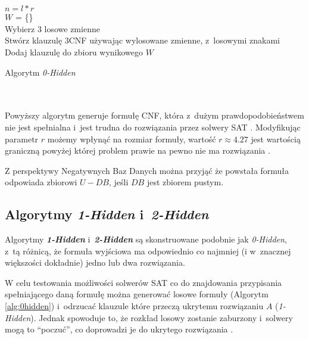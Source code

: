  ~\\\\
 \begin{algorithm}[H]
     \SetAlgoLined
     
     $n = l * r$\\
     $W$ = \{\}\\
     {
         Wybierz 3 losowe zmienne\\
         Stwórz klauzulę 3CNF używając wylosowane zmienne, z~losowymi znakami\\
         Dodaj klauzulę do zbioru wynikowego $W$
     } 
     
     \caption{Algorytm \textit{0-Hidden}}
     \label{alg:0hidden}
 \end{algorithm}
 ~\\\\
Powyższy algorytm generuje formułę CNF, która z~dużym prawdopodobieństwem nie jest spełnialna i~jest trudna do rozwiązania przez solwery SAT \cite{GeneratingHardFormulasByHidingSolutionsDeceptively, HidingSatisfyingAssignmentsTwoAreBetterThanOne}.
Modyfikując parametr $r$ możemy wpłynąć na rozmiar formuły, wartość $r \approx 4.27$ jest wartością graniczną powyżej której problem prawie na pewno nie ma rozwiązania \cite{GeneratingHardFormulasByHidingSolutionsDeceptively}.

Z perspektywy Negatywnych Baz Danych można przyjąć że powstała formuła odpowiada zbiorowi $U - DB$, jeśli $DB$ jest zbiorem pustym.

\subsection{Algorytmy \textit{1-Hidden} i~\textit{2-Hidden}}
\label{sec:12hidden}
Algorytmy \textit{\textbf{1-Hidden}} i~\textit{\textbf{2-Hidden}} są skonstruowane podobnie jak \textit{0-Hidden}, z~tą różnicą, że formuła wyjściowa ma odpowiednio co najmniej (i w~znacznej większości dokładnie) jedno lub dwa rozwiązania.  
 
W celu testowania możliwości solwerów SAT co do znajdowania przypisania spełniającego daną formułę można generować losowe formuły (Algorytm \ref{alg:0hidden}) i~odrzucać klauzule które
przeczą ukrytemu rozwiązaniu $A$ (\textit{1-Hidden}). Jednak spowoduje to, że rozkład losowy zostanie zaburzony i~solwery mogą to \enquote{poczuć}, co doprowadzi je do ukrytego rozwiązania \cite{HidingSatisfyingAssignmentsTwoAreBetterThanOne}.
    

